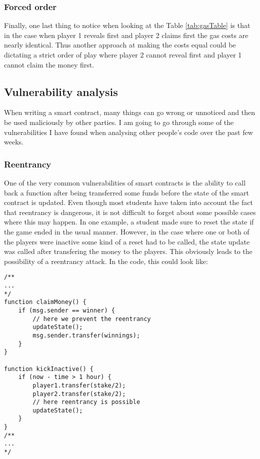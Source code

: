 \documentclass{article}
\begin{document}
    \subsubsection{Forced order}
    Finally, one last thing to notice when looking at the
    Table \ref{tab:gasTable} is that in the case when player
    1 reveals first and player 2 claims first the gas costs
    are nearly identical. Thus another approach at making
    the costs equal could be dictating a strict order of
    play where player 2 cannot reveal first and player 1
    cannot claim the money first.

    \subsection{Vulnerability analysis}
    When writing a smart contract, many things can go wrong
    or unnoticed and then be used maliciously by other
    parties. I am going to go through some of the
    vulnerabilities I have found when analysing other
    people's code over the past few weeks.

    \subsubsection{Reentrancy}
    One of the very common vulnerabilities of smart
    contracts is the ability to call back a function after
    being transferred some funds before the state of the
    smart contract is updated. Even though most students
    have taken into account the fact that reentrancy is
    dangerous, it is not difficult to forget about some
    possible cases where this may happen. In one example, a
    student made sure to reset the state if the game ended
    in the usual manner. However, in the case where one or
    both of the players were inactive some kind of a reset
    had to be called, the state update was called after
    transfering the money to the players. This obviously
    leads to the possibility of a reentrancy attack. In the
    code, this could look like:

    \begin{lstlisting}[language=Solidity]
/**
...
*/
function claimMoney() {
    if (msg.sender == winner) {
        // here we prevent the reentrancy
        updateState();
        msg.sender.transfer(winnings);
    }
}

function kickInactive() {
    if (now - time > 1 hour) {
        player1.transfer(stake/2);
        player2.transfer(stake/2);
        // here reentrancy is possible
        updateState();
    }
}
/**
...
*/
    \end{lstlisting}
\end{document}
